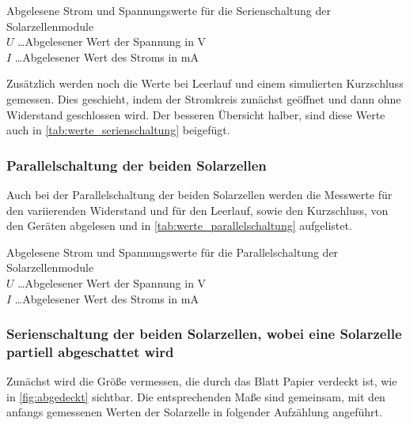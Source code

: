 \documentclass[12pt,english,ngerman]{scrartcl}
\begin{document}

\begin{table}[H]
	\caption[Abgelesene Strom und Spannungswerte für die Serienschaltung der Solarzellenmodule]
	{Abgelesene Strom und Spannungswerte für die Serienschaltung der Solarzellenmodule\\
	$U$ \dots Abgelesener Wert der Spannung in V\\
	$I$ \dots Abgelesener Wert des Stroms in mA
	}\label{tab:werte_serienschaltung}
	\centering
	
\end{table}

Zusätzlich werden noch die Werte bei Leerlauf und einem simulierten Kurzschluss
gemessen. Dies geschieht, indem der Stromkreis zunächst geöffnet und dann ohne
Widerstand geschlossen wird. Der besseren Übersicht halber, sind diese Werte
auch in \autoref{tab:werte_serienschaltung} beigefügt.

\subsubsection{Parallelschaltung der beiden Solarzellen}
Auch bei der Parallelschaltung der beiden Solarzellen werden die Messwerte für
den variierenden Widerstand und für den Leerlauf, sowie den Kurzschluss, von
den Geräten abgelesen und in \autoref{tab:werte_parallelschaltung} aufgelistet.


\begin{table}[H]
	\caption[Abgelesene Strom und Spannungswerte für die Parallelschaltung der Solarzellenmodule]
	{Abgelesene Strom und Spannungswerte für die Parallelschaltung der Solarzellenmodule\\
	$U$ \dots Abgelesener Wert der Spannung in V\\
	$I$ \dots Abgelesener Wert des Stroms in mA}\label{tab:werte_parallelschaltung}
	\centering
	
\end{table}

\subsubsection{Serienschaltung der beiden Solarzellen, wobei eine Solarzelle partiell abgeschattet wird}
Zunächst wird die Größe vermessen, die durch das Blatt Papier verdeckt ist, wie
in \autoref{fig:abgedeckt} sichtbar. Die entsprechenden Maße sind gemeinsam,
mit den anfangs gemessenen Werten der Solarzelle in folgender
Aufzählung angeführt.
\end{document}
